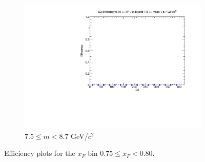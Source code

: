 \begin{figure}[p]
\begin{subfigure}[b]{0.32\textwidth}
        \includegraphics[width=\textwidth]{./kTrackerEfficiencyPlots/D2_Efficiency_xF15_mass10.pdf}
        \caption{$7.5 \leq m < 8.7$ GeV/$c^2$}
        \label{fig:xF15_mass10}
    \end{subfigure}
    \hfill
    \caption{Efficiency plots for the $x_F$ bin $0.75 \leq x_F < 0.80$.}
    \label{fig:xF15}
\end{figure}

\clearpage

